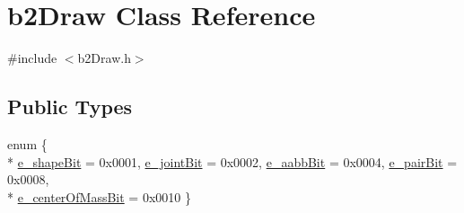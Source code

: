\hypertarget{classb2_draw}{}\section{b2\+Draw Class Reference}
\label{classb2_draw}


{\ttfamily \#include $<$b2\+Draw.\+h$>$}

\subsection*{Public Types}
\begin{DoxyCompactItemize}
\item 
enum \{ \\*
\hyperlink{classb2_draw_ae23c5d6c4f5230621f736593469cf7f2a1c8964c4f1fdc39e98b58ac38ecda1f9}{e\+\_\+shape\+Bit} = 0x0001, 
\hyperlink{classb2_draw_ae23c5d6c4f5230621f736593469cf7f2a241137a63679720c41a271c11681e2b3}{e\+\_\+joint\+Bit} = 0x0002, 
\hyperlink{classb2_draw_ae23c5d6c4f5230621f736593469cf7f2acdf1370108930182a45f39e7cc9b0cc7}{e\+\_\+aabb\+Bit} = 0x0004, 
\hyperlink{classb2_draw_ae23c5d6c4f5230621f736593469cf7f2ac86bb64ac65e555db28827407f2f2d43}{e\+\_\+pair\+Bit} = 0x0008, 
\\*
\hyperlink{classb2_draw_ae23c5d6c4f5230621f736593469cf7f2a7f1494d816479c7d23997a6c292cd8b6}{e\+\_\+center\+Of\+Mass\+Bit} = 0x0010
 \}
\end{DoxyCompactItemize}
